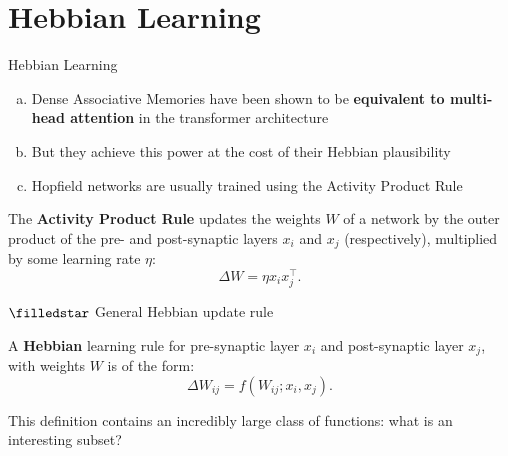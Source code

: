 \documentclass[]{beamer}
\begin{document}
\section{Hebbian Learning}
\begin{frame}{Hebbian Learning}
  \begin{enumerate}[(a)]
    \item Dense Associative Memories have been shown to be \textbf{equivalent
      to multi-head attention} in the transformer architecture
      \parencite{ramsauer_hopfield_2021,vaswani_attention_2023}
    \item But they achieve this power at the cost of their Hebbian plausibility
    \item Hopfield networks are usually trained using the Activity
      Product Rule \parencite{haykin_neural_2009}
  \end{enumerate}

  \begin{definition}
    The \textbf{Activity Product Rule} updates the weights $W$ of a
    network by the outer product of the pre-
    and post-synaptic layers $x_i$ and $x_j$ (respectively),
    multiplied by some learning rate $\eta$:
    $$
    \Delta W = \eta x_i x_j^\top.
    $$
  \end{definition}
\end{frame}

\begin{frame}{$\filledstar$ General Hebbian update rule}
  \begin{definition}
    A \textbf{Hebbian} learning rule for pre-synaptic layer $x_i$ and
    post-synaptic layer $x_j$, with weights $W$
    is of the form:
    $$
    \Delta W_{ij} = f(W_{ij}; x_i, x_j).
    $$
  \end{definition}

  This definition contains an incredibly large class of functions:
  what is an interesting subset?
\end{frame}
\end{document}
